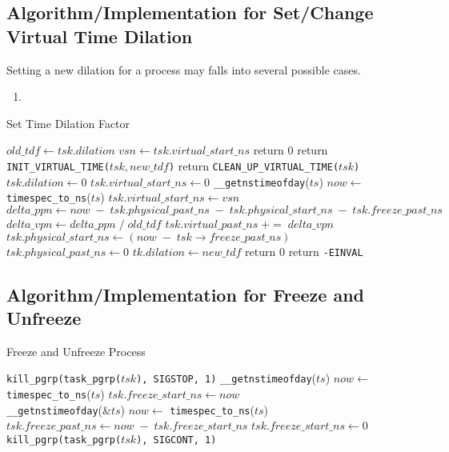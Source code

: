 \documentclass{acm_proc_article-sp}
\begin{document}
\subsection{Algorithm/Implementation for Set/Change Virtual Time Dilation}
Setting a new dilation for a process may falls into several possible cases.
\begin{enumerate}
\item 
\end{enumerate}
\begin{algorithm*}[t]
\caption{Set Time Dilation Factor}
\label{Alg-SetTDF}
\begin{algorithmic}[1]
\State $old\_tdf \gets tsk.dilation$
\State $vsn \gets tsk.virtual\_start\_ns$
	\State return 0
	\State return \texttt{\uppercase{init\_virtual\_time}($tsk, new\_tdf$)}
	\State return \texttt{\uppercase{clean\_up\_virtual\_time}($tsk$)}
	\State $tsk.dilation \gets 0$
	\State $tsk.virtual\_start\_ns \gets 0$
	\State \texttt{\_\_getnstimeofday}($ts$)
	\State $now \gets$ \texttt{timespec\_to\_ns}($ts$)
	\State $tsk.virtual\_start\_ns \gets vsn$
	\State $delta\_ppn \gets now \; - \; tsk.physical\_past\_ns \; - \; tsk. physical\_start\_ns \; - \; tsk. freeze\_past\_ns$
	\State $delta\_vpn \gets delta\_ppn \; / \; old\_tdf$
	\State $tsk.virtual\_past\_ns \; += \; delta\_vpn$
	\State $tsk.physical\_start\_ns \gets (now \; - \; tsk\rightarrow freeze\_past\_ns)$
	\State $tsk.physical\_past\_ns \gets 0$
	\State $tk.dilation \gets new\_tdf$
	\State return 0
\Else
	\State return \texttt{-EINVAL}
\EndIf
\EndFunction
\end{algorithmic}
\end{algorithm*}

\subsection{Algorithm/Implementation for Freeze and Unfreeze}
\label{Sub-Sec-Alg-Impl-Freeze}
\begin{algorithm}[t]
\caption{Freeze and Unfreeze Process}
\label{Alg-Freeze}
\begin{algorithmic}[1]
\State \texttt{kill\_pgrp(task\_pgrp($tsk$), SIGSTOP, 1)}
\State \texttt{\_\_getnstimeofday}($ts$)
\State $now \gets$ \texttt{timespec\_to\_ns}($ts$)
\State $tsk.freeze\_start\_ns \gets now$
\EndFunction
\\
\State \texttt{\_\_getnstimeofday}(\&$ts$)
\State $now \gets$ \texttt{timespec\_to\_ns}($ts$)
\State $tsk.freeze\_past\_ns \gets now \; - \; tsk.freeze\_start\_ns$
\State $tsk.freeze\_start\_ns \gets 0$
\State \texttt{kill\_pgrp(task\_pgrp($tsk$), SIGCONT, 1)}
\EndFunction
\end{algorithmic}
\end{algorithm}
\end{document}
